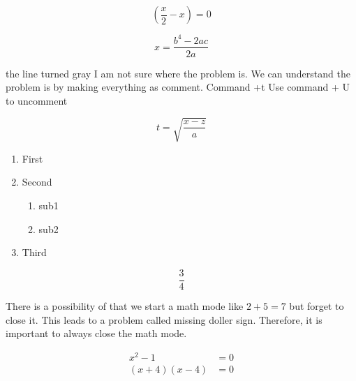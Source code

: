 \documentclass[12pt]{article}
\begin{document}
$$\left(\frac{x}{2}-x\right) = 0$$

$$x=\frac{b^4-2ac}{2a}$$


the line turned gray 
I am not sure where the problem is. 
We can understand the problem is by making everything as comment. Command +t
Use command + U to uncomment 

$$t=\sqrt{\frac{x-z}{a}}$$


\vspace{1cm}
\begin{enumerate}
	\item First
	\item Second 
		\begin{enumerate}
			\item sub1
			\item sub2
		\end{enumerate}
	\item Third
\end{enumerate}


$$\frac{3}{4}$$

There is a possibility of that we start a math mode like $2+5=7$ but forget to close it. 
This leads to a problem called missing doller sign. Therefore, it is important to always close the math mode. 

\begin{align*}
x^2-1 &=0\\
(x+4)(x-4)&=0
\end{align*}
\end{document}
